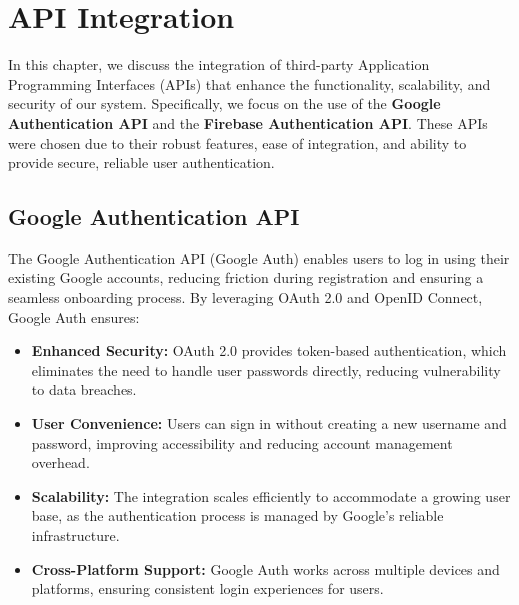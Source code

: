 \chapter{API Integration}
\label{chap:apiintegration}

In this chapter, we discuss the integration of third-party Application Programming Interfaces (APIs) that enhance the functionality, scalability, and security of our system. Specifically, we focus on the use of the \textbf{Google Authentication API} and the \textbf{Firebase Authentication API}. These APIs were chosen due to their robust features, ease of integration, and ability to provide secure, reliable user authentication.

\section{Google Authentication API}
The Google Authentication API (Google Auth) enables users to log in using their existing Google accounts, reducing friction during registration and ensuring a seamless onboarding process. By leveraging OAuth 2.0 and OpenID Connect, Google Auth ensures:
\begin{itemize}
    \item \textbf{Enhanced Security:} OAuth 2.0 provides token-based authentication, which eliminates the need to handle user passwords directly, reducing vulnerability to data breaches.
    \item \textbf{User Convenience:} Users can sign in without creating a new username and password, improving accessibility and reducing account management overhead.
    \item \textbf{Scalability:} The integration scales efficiently to accommodate a growing user base, as the authentication process is managed by Google’s reliable infrastructure.
    \item \textbf{Cross-Platform Support:} Google Auth works across multiple devices and platforms, ensuring consistent login experiences for users.
\end{itemize}

